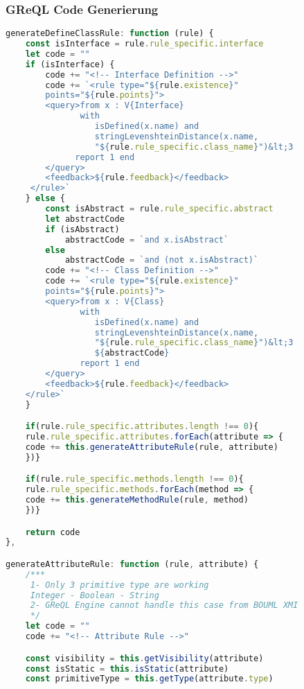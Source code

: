 \newpage

\subsubsection{GReQL Code Generierung}
\begin{lstlisting}[caption={Fall der Class Definition Rule}, label={lst:class_def_rule}, language=javascript]
generateDefineClassRule: function (rule) {
    const isInterface = rule.rule_specific.interface
    let code = ""
    if (isInterface) {
        code += "<!-- Interface Definition -->"
        code += `<rule type="${rule.existence}"
        points="${rule.points}">
        <query>from x : V{Interface}
               with
                  isDefined(x.name) and
                  stringLevenshteinDistance(x.name,
                  "${rule.rule_specific.class_name}")&lt;3
              report 1 end
        </query>
        <feedback>${rule.feedback}</feedback>
     </rule>`
    } else {
        const isAbstract = rule.rule_specific.abstract
        let abstractCode
        if (isAbstract)
            abstractCode = `and x.isAbstract`
        else
            abstractCode = `and (not x.isAbstract)`
        code += "<!-- Class Definition -->"
        code += `<rule type="${rule.existence}"
        points="${rule.points}">
        <query>from x : V{Class}
               with
                  isDefined(x.name) and
                  stringLevenshteinDistance(x.name,
                  "${rule.rule_specific.class_name}")&lt;3
                  ${abstractCode}
               report 1 end
        </query>
        <feedback>${rule.feedback}</feedback>
    </rule>`
    }

    if(rule.rule_specific.attributes.length !== 0){
    rule.rule_specific.attributes.forEach(attribute => {
    code += this.generateAttributeRule(rule, attribute)
    })}

    if(rule.rule_specific.methods.length !== 0){
    rule.rule_specific.methods.forEach(method => {
    code += this.generateMethodRule(rule, method)
    })}

    return code
},

generateAttributeRule: function (rule, attribute) {
    /***
     1- Only 3 primitive type are working
     Integer - Boolean - String
     2- GReQL Engine cannot handle this case from BOUML XMI
     */
    let code = ""
    code += "<!-- Attribute Rule -->"

    const visibility = this.getVisibility(attribute)
    const isStatic = this.isStatic(attribute)
    const primitiveType = this.getType(attribute.type)


\end{lstlisting}
